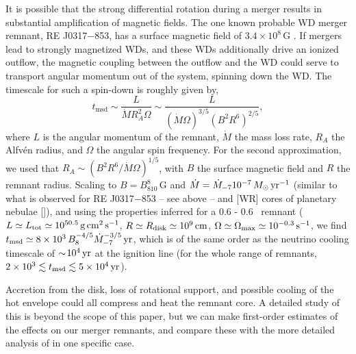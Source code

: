 It is possible that the strong differential rotation during a merger results in substantial amplification of magnetic fields.  The one known probable WD merger remnant, RE J0317$-$853, has a surface magnetic field of $3.4\times10^8\,$G \citep{bars+95,kube+10}.  If mergers lead to strongly magnetized WDs, and these WDs additionally drive an ionized outflow, the magnetic coupling between the outflow and the WD could serve to transport angular momentum out of the system, spinning down the WD.  The timescale for such a spin-down is roughly given by,
%
\begin{equation}
t_\mathrm{msd} \sim \frac{L}{\dot{M}R_A^2\Omega}
              \sim \frac{L}{(\dot M\Omega)^{3/5}(B^2R^6)^{2/5}},
\end{equation}
%
where $L$ is the angular momentum of the remnant, $\dot M$ the mass loss rate, $R_A$ the Alfv\'{e}n radius, and $\Omega$ the angular spin frequency.  For the second approximation, we used that $R_A\sim (B^2R^6/\dot M\Omega)^{1/5}$, with
$B$ the surface magnetic field and $R$ the remnant radius.  Scaling to  $B=B_810^8\,$G and $\dot M={\dot M}_{-7}10^{-7}\,\Msun{\rm\,yr^{-1}}$ (similar to what is observed for RE J0317$-$853 -- see above -- and [WR] cores of planetary nebulae [\citealt{hama97}]), and using the properties inferred for a 0.6 - 0.6 \Msun\ remnant ($L\simeq L_{\rm tot}\simeq10^{50.5}{\rm\,g\,cm^2\,s^{-1}}$, $R\simeq R_{\rm disk}\simeq10^9{\rm\,cm}$, $\Omega\simeq\Omega_{\rm max}\simeq10^{-0.3}{\rm\,s^{-1}}$, we find $t_{\rm msd}\simeq8\times10^3\,B_8^{-4/5}{\dot M}_{-7}^{-3/5}{\rm\,yr}$, which is of the same order as the neutrino cooling timescale of $\sim\!10^4{\rm\,yr}$ at the ignition line (for the whole range of remnants, $2\times10^3\lesssim t_{\rm msd}\lesssim 5\times10^4{\rm\,yr}$).

Accretion from the disk, loss of rotational support, and possible cooling of the hot envelope could all compress and heat the remnant core.  A detailed study of this is beyond the scope of this paper, but we can make first-order estimates of the effects on our merger remnants, and compare these with the more detailed analysis of \cite{schw+12} in one specific case.

